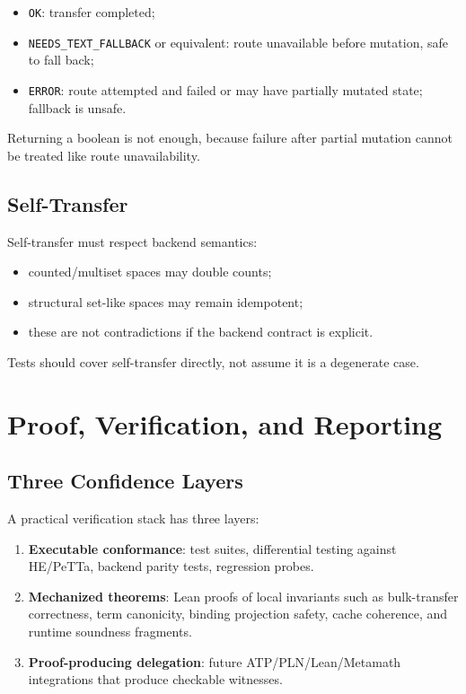 \documentclass[11pt]{article}
\newcommand{\PeTTa}{PeTTa}
\newcommand{\HE}{HE}
\begin{document}
\begin{itemize}[leftmargin=*]
  \item \texttt{OK}: transfer completed;
  \item \texttt{NEEDS\_TEXT\_FALLBACK} or equivalent: route unavailable before mutation, safe to fall back;
  \item \texttt{ERROR}: route attempted and failed or may have partially mutated state; fallback is unsafe.
\end{itemize}

Returning a boolean is not enough, because failure after partial mutation cannot be treated like route unavailability.

\subsection{Self-Transfer}

Self-transfer must respect backend semantics:

\begin{itemize}[leftmargin=*]
  \item counted/multiset spaces may double counts;
  \item structural set-like spaces may remain idempotent;
  \item these are not contradictions if the backend contract is explicit.
\end{itemize}

Tests should cover self-transfer directly, not assume it is a degenerate case.

\section{Proof, Verification, and Reporting}

\subsection{Three Confidence Layers}

A practical verification stack has three layers:

\begin{enumerate}[leftmargin=*]
  \item \textbf{Executable conformance}: test suites, differential testing against \HE{}/\PeTTa{}, backend parity tests, regression probes.
  \item \textbf{Mechanized theorems}: Lean proofs of local invariants such as bulk-transfer correctness, term canonicity, binding projection safety, cache coherence, and runtime soundness fragments.
  \item \textbf{Proof-producing delegation}: future ATP/PLN/Lean/Metamath integrations that produce checkable witnesses.
\end{enumerate}
\end{document}
